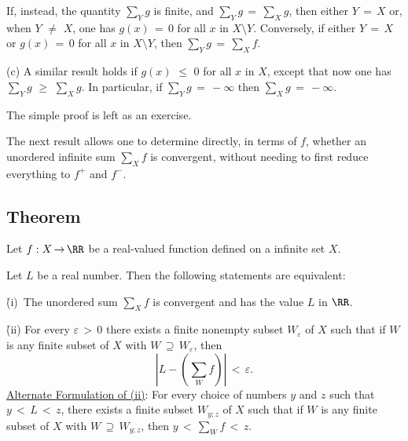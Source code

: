         If, instead, the quantity ${\sum}_{Y} g$ is finite, and ${\sum}_{Y} g \,=\, {\sum}_{X} g$,
    then either $Y \,=\, X$ or, when $Y \,\,{\neq}\,\, X$,
    one has $g(x) \,=\, 0$ for all $x$ in $X{\setminus}Y$.
    Conversely, if either $Y \,=\, X$ or $g(x) \,=\, 0$ for all $x$ in $X{\setminus}Y$, then ${\sum}_{Y} g \,=\, {\sum}_{X} f$.

\V

        (c) A similar result holds if $g(x)\,\,{\leq}\,\,0$ for all $x$ in $X$, except that now one has ${\sum}_{Y} g\,\,{\geq}\,\,{\sum}_{X} g$.
    In particular, if ${\sum}_{Y} g \,=\, -{\infty}$ then ${\sum}_{X} g \,=\, -{\infty}$.


        The simple proof is left as an exercise.

\V
\V


        The next result allows one to determine directly, in terms of $f$, whether an unordered infinite sum ${\sum}_{X} f$ is convergent,
    without needing to first reduce everything to $f^{+}$ and $f^{-}$.

\V

            \subsection{\small{\bf Theorem}}
            \label{ThmG20.50}

\V

        Let $f:X \,{\rightarrow}\, {\RR}$ be a real-valued function defined on a infinite set $X$.

\V

        Let $L$ be a real number. Then the following statements are equivalent:

        \h (i)\, The unordered sum ${\sum}_{X} f$ is convergent and has the value $L$ in ${\RR}$.

        \h (ii) For every ${\varepsilon}\,>\,0$ there exists a finite nonempty subset $W_{{\varepsilon}}$ of $X$ such that if $W$ is any finite subset of $X$ with $W \,{\supseteq}\, W_{{\varepsilon}}$,
then
        \begin{displaymath}
        \left|L-\left({\sum}_{W} f\right)\right|\,<\,{\varepsilon}.
        \end{displaymath}
    \underline{Alternate Formulation of (ii)}: For every choice of numbers $y$ and $z$ such that $y\,<\,L\,<\,z$,
    there exists a finite subset $W_{y;z}$ of $X$ such that if $W$ is any finite subset of $X$ with $W \,{\supseteq}\, W_{y;z}$, then $y\,<\,\sum_{W} f\,<\,z$.

